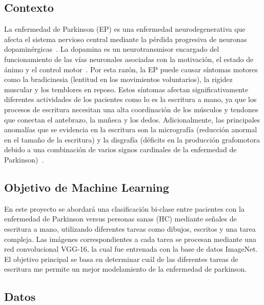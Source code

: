 \documentclass[10pt, a4paper]{article}
\begin{document}
\newpage

\subsection*{Contexto}

La enfermedad de Parkinson (EP) es una enfermedad neurodegenerativa que afecta 
el sistema nervioso central mediante la pérdida progresiva de neuronas 
dopaminérgicas~\cite{ref1}. La dopamina es un neurotransmisor encargado del 
funcionamiento de las vías neuronales asociadas con la motivación, el estado de 
ánimo y el control motor~\cite{ref2}. Por esta razón, la EP puede causar síntomas 
motores como la bradicinesia (lentitud en los movimientos voluntarios), la rigidez 
muscular y los temblores en reposo. Estos síntomas afectan significativamente 
diferentes actividades de los pacientes como lo es la escritura a mano, ya que los 
procesos de escritura necesitan una alta coordinación de los músculos y tendones 
que conectan el antebrazo, la muñeca y los dedos. Adicionalmente, las principales 
anomalías que se evidencia en la escritura son la micrografía (reducción anormal en 
el tamaño de la escritura) y la disgrafía (déficits en la producción grafomotora 
debido a una combinación de varios signos cardinales de la enfermedad de Parkinson)~\cite{ref32}.


\subsection*{Objetivo de Machine Learning}

En este proyecto se abordará una clasificación bi-clase entre pacientes con la enfermedad de Parkinson 
versus personas sanas (HC) mediante señales de escritura a mano, utilizando diferentes tareas como dibujos, 
escritos y una tarea compleja. Las imágenes correspondientes a cada tarea se procesan mediante una red 
convolucional VGG-16, la cual fue entrenada con la base de datos ImageNet. El objetivo principal se 
basa en determinar cuál de las diferentes tareas de escritura me permite un mejor modelamiento de 
la enfermedad de parkinson.



\subsection*{Datos}
\end{document}
